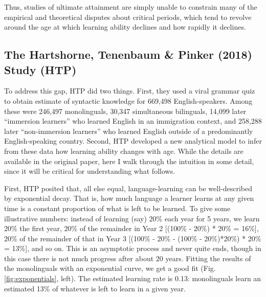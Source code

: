 \documentclass[
  english,
  doc,floatsintext]{apa6}
\begin{document}
Thus, studies of ultimate attainment are simply unable to constrain many of the empirical and theoretical disputes about critical periods, which tend to revolve around the age at which learning ability declines and how rapidly it declines.

\hypertarget{the-hartshorne-tenenbaum-pinker-2018-study-htp}{%
\subsection{The Hartshorne, Tenenbaum \& Pinker (2018) Study (HTP)}\label{the-hartshorne-tenenbaum-pinker-2018-study-htp}}

To address this gap, HTP did two things. First, they used a viral grammar quiz to obtain estimate of syntactic knowledge for 669,498 English-speakers. Among these were 246,497 monolinguals, 30,347 simultaneous bilinguals, 14,099 later ``immersion learners'' who learned English in an immigration context, and 258,288 later ``non-immersion learners'' who learned English outside of a predominantly English-speaking country. Second, HTP developed a new analytical model to infer from these data how learning ability changes with age. While the details are available in the original paper, here I walk through the intuition in some detail, since it will be critical for understanding what follows.

First, HTP posited that, all else equal, language-learning can be well-described by exponential decay. That is, how much language a learner learns at any given time is a constant proportion of what is left to be learned. To give some illustrative numbers: instead of learning (say) 20\% each year for 5 years, we learn 20\% the first year, 20\% of the remainder in Year 2 {[}(100\% - 20\%) * 20\% = 16\%{]}, 20\% of the remainder of that in Year 3 {[}(100\% - 20\% - (100\% - 20\%)*20\%) * 20\% = 13\%{]}, and so on. This is an asymptotic process and never quite ends, though in this case there is not much progress after about 20 years. Fitting the results of the monolinguals with an exponential curve, we get a good fit (Fig. \ref{fig:exponentials}, left). The estimated learning rate is 0.13: monolinguals learn an estimated 13\% of whatever is left to learn in a given year.
\end{document}
